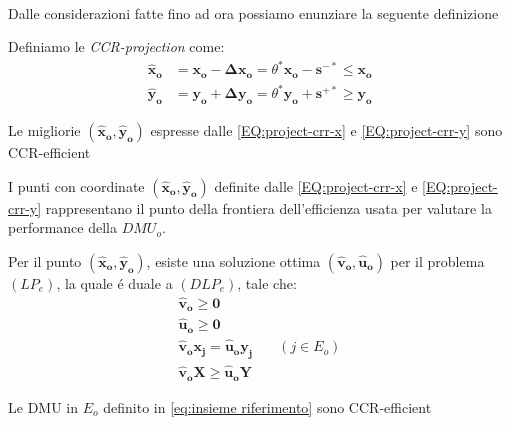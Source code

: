 \paragraph{} Dalle considerazioni fatte fino  ad ora possiamo enunziare la seguente definizione
\begin{definiz} Definiamo le \emph{CCR-projection} come:
\begin{equation} \label{EQ:project-crr-x}
\begin{split} 
\boldsymbol{\hat{x}_{o}} & = \boldsymbol{x_o - \Delta x_{o}} = \theta^*\boldsymbol{x_o - s^{-*}} \leq \boldsymbol{x_o}
\end{split}
\end{equation}
\begin{equation} \label{EQ:project-crr-y}
\begin{split}
\boldsymbol{\hat{y}_{o}} & = \boldsymbol{y_o + \Delta y_{o}} = \theta^*\boldsymbol{y_o + s^{+*}} \geq \boldsymbol{y_o} 
\end{split}
\end{equation}
\end{definiz}
\begin{teor}
Le migliorie $(\boldsymbol{\hat{x}_{o},\hat{y}_{o}})$ espresse dalle \ref{EQ:project-crr-x} e \ref{EQ:project-crr-y} sono CCR-efficient
\end{teor}
\begin{cor} I punti con coordinate $(\boldsymbol{\hat{x}_{o},\hat{y}_{o}})$ definite dalle \ref{EQ:project-crr-x} e \ref{EQ:project-crr-y} rappresentano il punto della frontiera dell'efficienza usata per valutare la performance della $DMU_{o}$.
\end{cor}
\begin{lemma}
Per il punto $(\boldsymbol{\hat{x}_{o},\hat{y}_{o}})$, esiste una soluzione ottima $(\boldsymbol{\hat{v}_{o},\hat{u}_{o}})$ per il problema $(LP_{e})$, la quale \'e duale a $(DLP_{e})$, tale che:
\begin{equation}
\begin{split}
\boldsymbol{\hat{v}_{o} \geq 0} & \\
\boldsymbol{\hat{u}_{o} \geq 0} & \\
\boldsymbol{\hat{v}_{o}x_{j} = \hat{u}_{o}y_{j}} & \quad (j \in E_{o}) \\
\boldsymbol{\hat{v}_{o}X \geq \hat{u}_{o}Y} & 
\end{split}
\end{equation}
\end{lemma}
\begin{teor} Le DMU in $E_{o}$ definito in \ref{eq:insieme riferimento} sono CCR-efficient
\end{teor}
